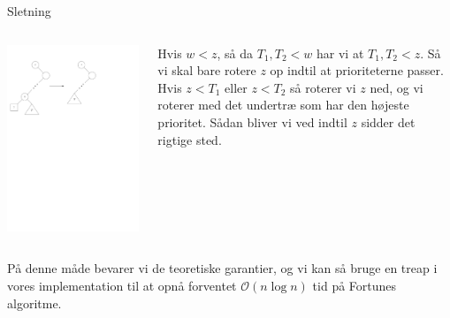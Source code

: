 \documentclass{beamer} %
\newcommand{\longpause}{\break \break \pause}
\begin{document}
\begin{frame}
Sletning
\begin{columns}
\begin{column}{0.5\textwidth}
	\begin{center}
		\includegraphics[scale=0.4]{../images/tree_remove_xy}
	\end{center}
\end{column}
\begin{column}{0.5\textwidth}
    \pause Hvis $w < z$\pause, så da $T_1, T_2 < w$ \pause har vi at $T_1, T_2 < z$. \pause Så vi skal bare rotere $z$ op indtil at prioriteterne passer.
    \longpause Hvis $z < T_1$ eller $z < T_2$ \pause så roterer vi $z$ ned\pause, og vi roterer med det undertræ som har den højeste prioritet. \pause Sådan bliver vi ved indtil $z$ sidder det rigtige sted.
\end{column}
\end{columns}
\longpause
\vspace{1em}
På denne måde bevarer vi de teoretiske garantier, og vi kan så bruge en treap i vores implementation til at opnå forventet $\mathcal{O}(n \log n)$ tid på Fortunes algoritme.
\end{frame}
\end{document}
